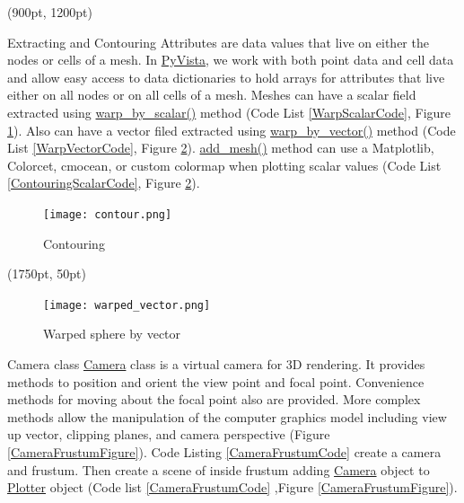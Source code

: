 \documentclass[final]{beamer}
\begin{document}
\begin{frame}[fragile]
\begin{textblock*}{800pt}(900pt, 1200pt)
\begin{block}{Extracting and Contouring}
Attributes are data values that live on either the nodes or cells of a mesh.
In \href{https://pypi.org/project/pyvista/}{PyVista}, we work with both point data and cell data and allow easy access to data dictionaries to hold arrays for attributes that live either on all nodes or on all cells of a mesh.
Meshes can have a scalar field extracted
using \href{https://dev.pyvista.org/core/filters.html#pyvista.DataSetFilters.warp_by_scalar}{warp\_by\_scalar()} method
(Code List \ref{WarpScalarCode}, Figure \ref{WarpScalarFigure}).
Also can have a vector filed extracted
using \href{https://dev.pyvista.org/core/filters.html#pyvista.DataSetFilters.warp_by_vector}{warp\_by\_vector()} method
(Code List \ref{WarpVectorCode}, Figure \ref{WarpVectorFigure}).
\href{https://dev.pyvista.org/plotting/plotting.html#pyvista.BasePlotter.add\_mesh}{add\_mesh()} method can use a Matplotlib, Colorcet, cmocean, or custom colormap when plotting scalar values
(Code List \ref{ContouringScalarCode}, Figure \ref{WarpVectorFigure}).


\begin{figure}
\texttt{[image: contour.png]}
\caption{Contouring\label{WarpScalarFigure}}
\end{figure}
\end{block}
\end{textblock*}

\begin{textblock*}{800pt}(1750pt, 50pt)

\begin{figure}
\texttt{[image: warped\_vector.png]}
\caption{Warped sphere by vector\label{WarpVectorFigure}}
\end{figure}
\begin{block}{Camera class}
\href{https://dev.pyvista.org/core/camera.html}{Camera} class is a virtual camera for 3D rendering.
It provides methods to position and orient the view point and focal point.
Convenience methods for moving about the focal point also are provided.
More complex methods allow the manipulation of the computer graphics model including view up vector, clipping planes, and camera perspective (Figure \ref{CameraFrustumFigure}).
Code Listing \ref{CameraFrustumCode} create a camera and frustum.
Then create a scene of inside frustum adding \href{https://dev.pyvista.org/core/camera.html}{Camera} object to \href{https://dev.pyvista.org/plotting/plotting.html#pyvista.Plotter}{Plotter} object
(Code list \ref{CameraFrustumCode} ,Figure \ref{CameraFrustumFigure}).


\end{block}
\end{textblock*}
\end{frame}
\end{document}
